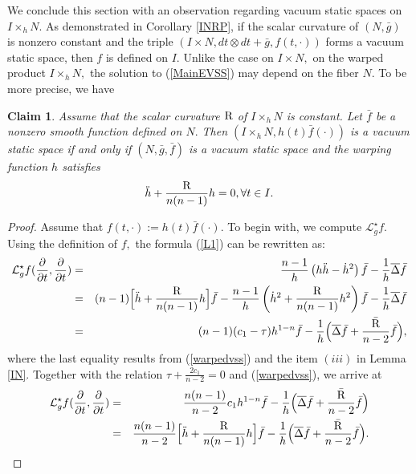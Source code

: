 \documentclass[10pt,leqno,oneside]{amsart}
\newtheorem{Cla}{Claim}
\begin{document}
{         We conclude this section with an observation regarding vacuum static spaces on $I\times_hN$. As demonstrated in Corollary \ref{INRP}, if the scalar curvature of $(N, \bar{g})$ is nonzero constant and the triple $(I\times N, dt\otimes dt+\bar{g}, f(t,\cdot))$ forms a vacuum static space, then $f$ is defined on $I.$ Unlike the case on $I\times N,$ on the warped product $I\times_hN,$ the solution to (\ref{MainEVSS}) may depend on the fiber $N.$ To be more precise, we have
    \begin{Cla}\label{propddoth}
         Assume that the scalar curvature $\rm{R}$ of $I\times_hN$ is constant. Let $\bar{f}$ be a nonzero smooth function defined on $N.$ Then $(I\times_hN, h(t)\bar{f}(\cdot))$ is a vacuum static space if and only if $(N, \bar{g}, \bar{f})$ is a vacuum static space and the warping function $h$ satisfies
         \begin{equation}\label{heq}
           \ddot{h}+\frac{\rm{R}}{n(n-1)}h=0,\forall t\in I.
         \end{equation}
    \end{Cla}
    \begin{proof}
         Assume that $f(t,\cdot):=h(t)\bar{f}(\cdot).$ To begin with, we compute $\mathcal{L}_g^{\star}f.$ Using the definition of $f,$ the formula (\ref{L1}) can be rewritten as:
         \begin{eqnarray*}
           \mathcal{L}_g^{\star}f(\frac{\partial}{\partial t},\frac{\partial}{\partial t}) &=&\frac{n-1}{h}\left(h\ddot{h}-\dot{h}^2\right)\bar{f}-\frac{1}{h}\overline{\Delta}\bar{f} \\
            &=&(n-1)\Big[\ddot{h}+\frac{\rm{R}}{n(n-1)}h\Big]\bar{f}-\frac{n-1}{h}\left(\dot{h}^2+\frac{\rm{R}}{n(n-1)}h^2\right)\bar{f}-\frac{1}{h}\overline{\Delta}\bar{f}\\
            &=&(n-1)(c_1-\tau)h^{1-n}\bar{f}-\frac{1}{h}\Big(\overline{\Delta}\bar{f}+\frac{\bar{{\rm R}}}{n-2}\bar{f}\Big),
         \end{eqnarray*}
         where the last equality results from (\ref{warpedvss}) and the item $(iii)$ in Lemma \ref{IN}. Together with the relation $\tau+\frac{2c_1}{n-2}=0$ and (\ref{warpedvss}), we arrive at
         \begin{eqnarray}\label{hbarftt}
          \mathcal{L}_g^{\star}f(\frac{\partial}{\partial t},\frac{\partial}{\partial t}) &=& \frac{n(n-1)}{n-2}c_1h^{1-n}\bar{f}-\frac{1}{h}\Big(\overline{\Delta}\bar{f}+\frac{\bar{{\rm R}}}{n-2}\bar{f}\Big)\nonumber \\
            &=& \frac{n(n-1)}{n-2}\Big[\ddot{h}+\frac{\rm{R}}{n(n-1)}h\Big]\bar{f}-\frac{1}{h}\Big(\overline{\Delta}\bar{f}+\frac{\bar{{\rm R}}}{n-2}\bar{f}\Big).

\end{eqnarray}
\end{proof}}
\end{document}
